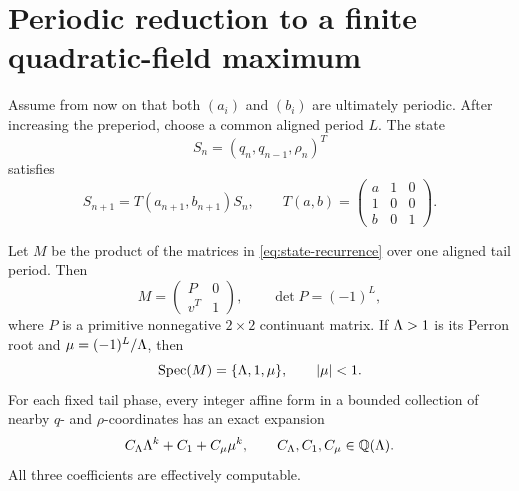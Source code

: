 \section{Periodic reduction to a finite quadratic-field maximum}
\label{sec:periodic}

Assume from now on that both $(a_i)$ and $(b_i)$ are ultimately periodic.
After increasing the preperiod, choose a common aligned period $L$.  The state
\[
 S_n=(q_n,q_{n-1},\rho_n)^T
\]
satisfies
\begin{equation}
 S_{n+1}=T(a_{n+1},b_{n+1})S_n,
 \qquad
 T(a,b)=
 \begin{pmatrix}
 a&1&0\\
 1&0&0\\
 b&0&1
 \end{pmatrix}.
 \label{eq:state-recurrence}
\end{equation}

\begin{lemma}
\label{lem:three-scales}
Let $M$ be the product of the matrices in \eqref{eq:state-recurrence} over one
aligned tail period.  Then
\begin{equation}
 M=\begin{pmatrix}P&0\\v^T&1\end{pmatrix},
 \qquad
 \det P=(-1)^L,
 \label{eq:block-period}
\end{equation}
where $P$ is a primitive nonnegative $2\times2$ continuant matrix.  If
$\Lambda>1$ is its Perron root and
$\mu=(-1)^L/\Lambda$, then
\[
 \operatorname{Spec}(M)=\{\Lambda,1,\mu\},
 \qquad |\mu|<1.
\]
For each fixed tail phase, every integer affine form in a bounded collection
of nearby $q$- and $\rho$-coordinates has an exact expansion
\begin{equation}
 C_\Lambda\Lambda^k+C_1+C_\mu\mu^k,
 \qquad C_\Lambda,C_1,C_\mu\in\mathbb{Q}(\Lambda).
 \label{eq:three-scale-expansion}
\end{equation}
All three coefficients are effectively computable.
\end{lemma}

